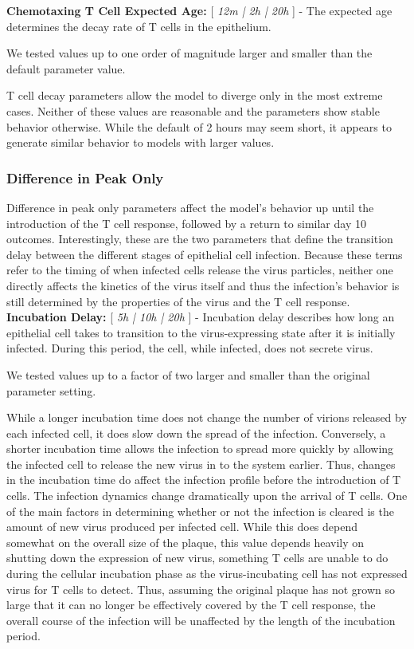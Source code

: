 \documentclass[10pt]{article}
\begin{document}
\textbf{Chemotaxing T Cell Expected Age:} [ \textit{12m | 2h | 20h} ] - The expected age determines the decay rate of T cells in the epithelium.  

We tested values up to one order of magnitude larger and smaller than the default parameter value.

T cell decay parameters allow the model to diverge only in the most extreme cases.  Neither of these values are reasonable and the parameters show stable behavior otherwise.  While the default of 2 hours may seem short, it appears to generate similar behavior to models with larger values.

\subsubsection{Difference in Peak Only} 

Difference in peak only parameters affect the model's behavior up until the introduction of the T cell response, followed by a return to similar day 10 outcomes.  Interestingly, these are the two parameters that define the transition delay between the different stages of epithelial cell infection. Because these terms refer to the timing of when infected cells release the virus particles, neither one directly affects the kinetics of the virus itself and thus the infection's behavior is still determined by the properties of the virus and the T cell response. \\


\textbf{Incubation Delay:} [ \textit{5h | 10h | 20h} ] - Incubation delay describes how long an epithelial cell takes to transition to the virus-expressing state after it is initially infected.  During this period, the cell, while infected, does not secrete virus.

We tested values up to a factor of two larger and smaller than the original parameter setting.  

While a longer incubation time does not change the number of virions released by each infected cell, it does slow down the spread of the infection.  Conversely, a shorter incubation time allows the infection to spread more quickly by allowing the infected cell to release the new virus in to the system earlier.  Thus, changes in the incubation time do affect the infection profile before the introduction of T cells.  The infection dynamics change dramatically upon the arrival of T cells.  One of the main factors in determining whether or not the infection is cleared is the amount of new virus produced per infected cell.  While this does depend somewhat on the overall size of the plaque, this value depends heavily on shutting down the expression of new virus, something T cells are unable to do during the cellular incubation phase as the virus-incubating cell has not expressed virus for T cells to detect.  Thus, assuming the original plaque has not grown so large that it can no longer be effectively covered by the T cell response, the overall course of the infection will be unaffected by the length of the incubation period. \\
\end{document}
